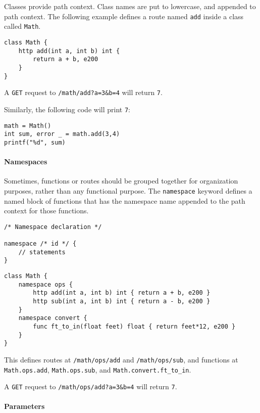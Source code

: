 \documentclass[]{article}
\begin{document}
Classes provide path context. Class names are put to lowercase, and
appended to path context. The following example defines a route named
\texttt{add} inside a class called \texttt{Math}.

\begin{verbatim}
class Math {
    http add(int a, int b) int {
        return a + b, e200
    }
}
\end{verbatim}

A \texttt{GET} request to \texttt{/math/add?a=3\&b=4} will return
\texttt{7}.

Similarly, the following code will print \texttt{7}:

\begin{verbatim}
math = Math()
int sum, error _ = math.add(3,4)
printf("%d", sum)
\end{verbatim}

\paragraph{Namespaces}\label{namespaces}

Sometimes, functions or routes should be grouped together for
organization purposes, rather than any functional purpose. The
\texttt{namespace} keyword defines a named block of functions that has
the namespace name appended to the path context for those functions.

\begin{verbatim}
/* Namespace declaration */

namespace /* id */ {
    // statements
}
\end{verbatim}

\begin{verbatim}
class Math {
    namespace ops {
        http add(int a, int b) int { return a + b, e200 }
        http sub(int a, int b) int { return a - b, e200 }   
    }
    namespace convert {
        func ft_to_in(float feet) float { return feet*12, e200 }    
    }
}
\end{verbatim}

This defines routes at \texttt{/math/ops/add} and
\texttt{/math/ops/sub}, and functions at \texttt{Math.ops.add},
\texttt{Math.ops.sub}, and \texttt{Math.convert.ft\_to\_in}.

A \texttt{GET} request to \texttt{/math/ops/add?a=3\&b=4} will return
\texttt{7}.

\paragraph{Parameters}\label{parameters}
\end{document}
